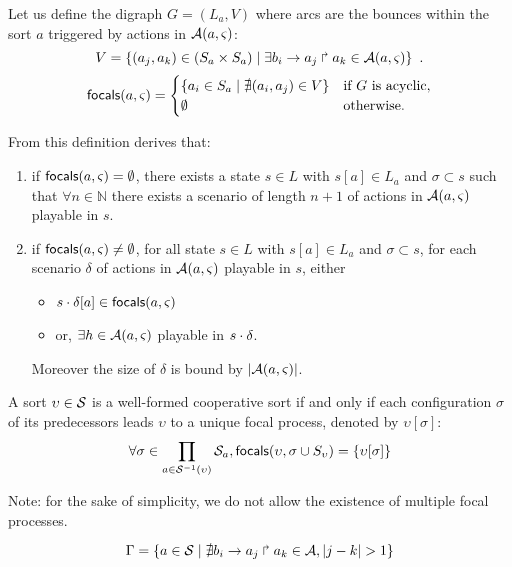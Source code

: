 \begin{definition}
Let us define the digraph $G = (L_a, V)$ where arcs are the bounces within the sort $a$
triggered by actions in $\mathcal A(a,\varsigma)$:
\[V = \{(a_j,a_k)\in (S_a \times S_a) \mid 
			\exists b_i\rightarrow a_j\Rsh a_k\in \mathcal A(a,\varsigma)\}\enspace.\]
\[
\mathsf{focals}(a,\varsigma) = 
\begin{cases}
\{ a_i \in S_a \mid \nexists (a_i,a_j)\in V\} & \text{if $G$ is acyclic},\\
\emptyset & \text{otherwise.}\\
\end{cases}
\]
\end{definition}
From this definition derives that:
\begin{enumerate}
\item if $\mathsf{focals}(a,\varsigma)=\emptyset$, there exists a 
state $s\in L$ with $s[a]\in L_a$ and $\sigma\subset s$
such that $\forall n\in\mathbb N$ there 
exists a scenario of length $n+1$ of actions in $\mathcal A(a,\varsigma)$ playable in $s$.
\item if $\mathsf{focals}(a,\varsigma)\neq\emptyset$, for all
state $s\in L$ with $s[a]\in L_a$ and $\sigma\subset s$, for each scenario $\delta$ of actions in
$\mathcal A(a,\varsigma)$ playable in $s$,
either
\begin{itemize}
\item $s\cdot\delta[a] \in \mathsf{focals}(a,\varsigma)$
\item or, $\exists h\in \mathcal A(a,\varsigma)$ playable in $s\cdot\delta$.
\end{itemize}
Moreover the size of $\delta$ is bound by $|\mathcal A(a,\varsigma)|$.
\end{enumerate}
\begin{property}
A sort $\upsilon\in\mathcal{S}$ is a well-formed cooperative sort if and only if
each configuration $\sigma$ of its predecessors leads $\upsilon$ to a unique focal process,
denoted by $\upsilon[\sigma]$:
\[
\forall \sigma \in \prod_{a\in\mathcal{S}^{-1}(\upsilon)} \mathcal{S}_{a},
\mathsf{focals}(\upsilon,\sigma\cup S_\upsilon) = \{ \upsilon[\sigma] \}\]
\end{property}
Note: for the sake of simplicity, we do not allow the existence of multiple focal processes.

\begin{equation}
\Gamma = \{a \in \mathcal{S} \mid \nexists b_i\rightarrow a_j\Rsh a_k \in \mathcal{A}, |j - k| > 1\} \\
\label{eq:PH-components}
\end{equation}

